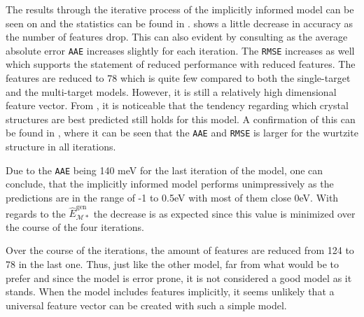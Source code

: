 The results through the iterative process of the implicitly informed model can be seen on  and the statistics can be found in .  shows a little decrease in accuracy as the number of features drop. This can also evident by consulting  as the average absolute error \texttt{AAE} increases slightly for each iteration. The \texttt{RMSE} increases as well which supports the statement of reduced performance with reduced features. The features are reduced to 78 which is quite few compared to both the single-target and the multi-target models. However, it is still a relatively high dimensional feature vector. From , it is noticeable that the tendency regarding which crystal structures are best predicted still holds for this model. A confirmation of this can be found in  , where it can be seen that the \texttt{AAE} and \texttt{RMSE} is larger for the wurtzite structure in all iterations. 

Due to the \texttt{AAE} being 140 meV for the last iteration of the model, one can conclude, that the implicitly informed model performs unimpressively as the predictions are in the range of -1 to 0.5eV with most of them close 0eV. With regards to the $\hat{E}_{\mathcal{M}*}^{\mathrm{gen}}$ the decrease is as expected since this value is minimized over the course of the four iterations.

Over the course of the iterations, the amount of features are reduced from 124 to 78 in the last one. Thus, just like the other model, far from what would be to prefer and since the model is error prone, it is not considered a good model as it stands. When the model includes features implicitly, it seems unlikely that a universal feature vector can be created with such a simple model.
 
\bigfirst
{}\bigsecond
{}\bigthird
{}\bigfourth



